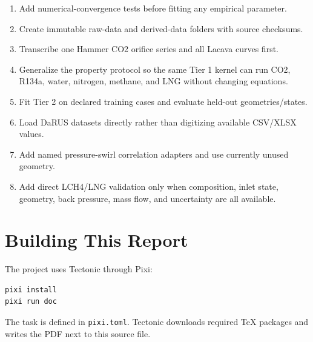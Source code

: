 \documentclass[11pt]{article}
\newcommand{\code}[1]{\nolinkurl{#1}}
\begin{document}
\begin{enumerate}
  \item Add numerical-convergence tests before fitting any empirical parameter.
  \item Create immutable raw-data and derived-data folders with source checksums.
  \item Transcribe one Hammer CO2 orifice series and all Lacava curves first.
  \item Generalize the property protocol so the same Tier 1 kernel can run CO2, R134a,
  water, nitrogen, methane, and LNG without changing equations.
  \item Fit Tier 2 on declared training cases and evaluate held-out geometries/states.
  \item Load DaRUS datasets directly rather than digitizing available CSV/XLSX values.
  \item Add named pressure-swirl correlation adapters and use currently unused geometry.
  \item Add direct LCH4/LNG validation only when composition, inlet state, geometry,
  back pressure, mass flow, and uncertainty are all available.
\end{enumerate}

\section{Building This Report}

The project uses Tectonic through Pixi:

\begin{verbatim}
pixi install
pixi run doc
\end{verbatim}

The task is defined in \code{pixi.toml}. Tectonic downloads required TeX packages and
writes the PDF next to this source file.
\end{document}
